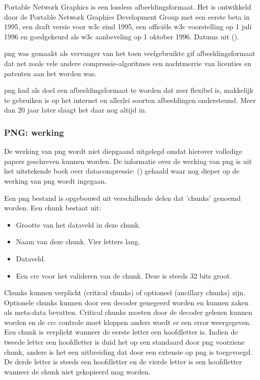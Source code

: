 Portable Network Graphics is een \gls{lossless} \gls{afbeeldingsformaat}. Het is ontwikkeld door de Portable Network Graphics Development Group met een eerste beta in 1995, een draft versie voor \gls{w3c} eind 1995, een officiële \gls{w3c} voorstelling op 1 juli 1996 en goedgekeurd als \gls{w3c} aanbeveling op 1 oktober 1996. Datums uit  (\cite{pnghistory}).

\Gls{png} was gemaakt als vervanger van het toen veelgebruikte \gls{gif} \gls{afbeeldingsformaat} dat net zoals vele andere \glspl{compressie-algoritme} een nachtmerrie van licenties en patenten aan het worden was. 

\Gls{png} had als doel een \gls{afbeeldingsformaat} te worden dat zeer flexibel is, makkelijk te gebruiken is op het internet en allerlei soorten afbeeldingen ondersteund. Meer dan 20 jaar later slaagt het daar nog altijd in.

\subsubsection{PNG: werking}
\label{sec:afbeeldingscompressie-png-werking}

De werking van \gls{png} wordt niet diepgaand uitgelegd omdat hierover volledige papers geschreven kunnen worden. De informatie over de werking van \gls{png} is uit het uitstekende boek over \gls{datacompressie}:  (\cite{Salomon2006}) gehaald waar nog dieper op de werking van \gls{png} wordt ingegaan.

Een \gls{png} bestand is opgebouwd uit verschillende delen dat 'chunks' genoemd worden. Een chunk bestaat uit:

\begin{itemize}
	
	\item Grootte van het dataveld in deze chunk.
	
	\item Naam van deze chunk. Vier letters lang.
	
	\item Dataveld.
	
	\item Een \gls{crc} voor het valideren van de chunk. Deze is steeds 32 \glspl{bit} groot.
	
\end{itemize}

Chunks kunnen verplicht (critical chunks) of optioneel (ancillary chunks) zijn. Optionele chunks kunnen door een \gls{decoder} genegeerd worden en kunnen zaken als \gls{meta-data} bevatten. Critical chunks moeten door de \gls{decoder} gelezen kunnen worden en de \gls{crc} controle moet kloppen anders wordt er een error weergegeven. Een chunk is verplicht wanneer de eerste letter een hoofdletter is. Indien de tweede letter een hoofdletter is duid het op een standaard door \gls{png} voorziene chunk, anders is het een uitbreiding dat door een extensie op \gls{png} is toegevoegd. De derde letter is steeds een hoofdletter en de vierde letter is een hoofdletter wanneer de chunk niet gekopieerd mag worden. 

